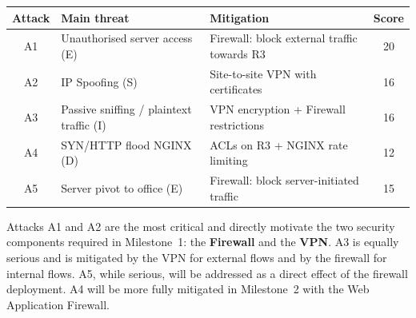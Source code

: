 \documentclass[a4paper,12pt]{article}
\begin{document}
\begin{center}
\begin{tabularx}{\textwidth}{cXXc}
  \toprule
  \textbf{Attack} & \textbf{Main threat} & \textbf{Mitigation}
  & \textbf{Score} \\
  \midrule
  A1 & Unauthorised server access (E)
     & Firewall: block external traffic towards R3 & 20 \\
  A2 & IP Spoofing (S)
     & Site-to-site VPN with certificates & 16 \\
  A3 & Passive sniffing / plaintext traffic (I)
     & VPN encryption + Firewall restrictions & 16 \\
  A4 & SYN/HTTP flood NGINX (D)
     & ACLs on R3 + NGINX rate limiting & 12 \\
  A5 & Server pivot to office (E)
     & Firewall: block server-initiated traffic & 15 \\
  \bottomrule
\end{tabularx}
\end{center}

Attacks A1 and A2 are the most critical and directly motivate the
two security components required in Milestone~1: the \textbf{Firewall}
and the \textbf{VPN}. A3 is equally serious and is mitigated by
the VPN for external flows and by the firewall for internal flows. A5, while serious, will be
addressed as a direct effect of the firewall deployment. A4 will be
more fully mitigated in Milestone~2 with the Web Application Firewall.
\end{document}
